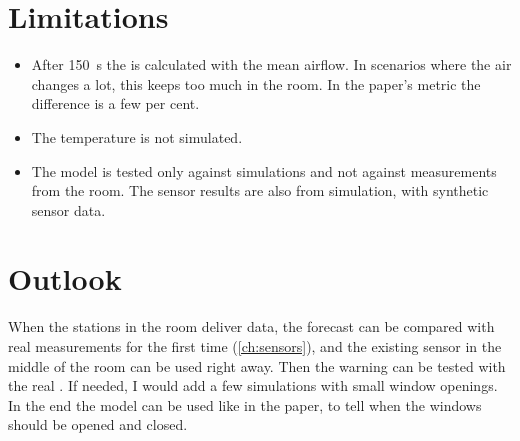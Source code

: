 \section{Limitations}
\begin{itemize}
  \item After 150~s the \cotwo{} is calculated with the mean airflow. In scenarios where the air changes a
        lot, this keeps too much \cotwo{} in the room. In the paper's metric the difference is a few per cent.
  \item The temperature is not simulated.
  \item The model is tested only against simulations and not against measurements from the room. The sensor
        results are also from simulation, with synthetic sensor data.
\end{itemize}

\section{Outlook}
When the stations in the room deliver data, the forecast can be compared with real measurements for the first
time (\cref{ch:sensors}), and the existing sensor in the middle of the room can be used right away. Then the
warning can be tested with the real \cotwo{}. If needed, I would add a few simulations with small window
openings. In the end the model can be used like in the paper, to tell when the windows should be opened and
closed.
